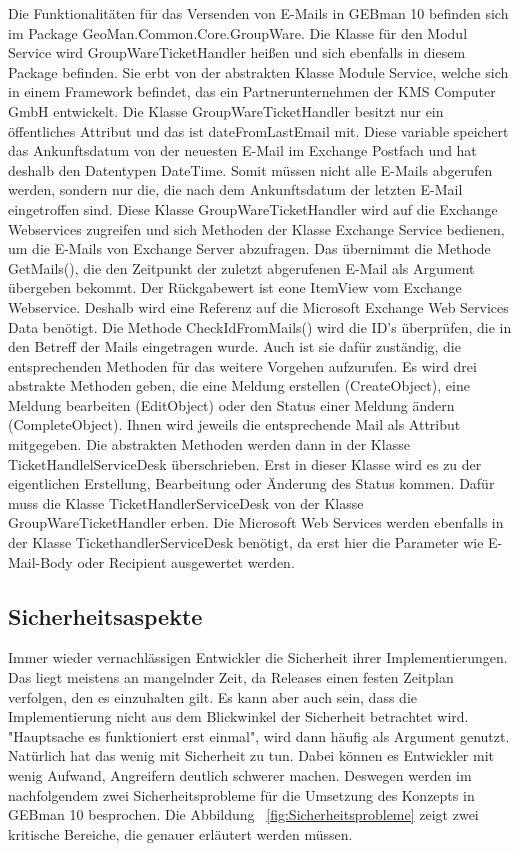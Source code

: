 \noindent
Die Funktionalitäten für das Versenden von E-Mails in GEBman 10 befinden sich im Package GeoMan.Common.Core.GroupWare. Die Klasse für den Modul Service wird GroupWareTicketHandler heißen und sich ebenfalls in diesem Package befinden. Sie erbt von der abstrakten Klasse Module Service, welche sich in einem Framework befindet, das ein Partnerunternehmen der KMS Computer GmbH entwickelt. Die Klasse GroupWareTicketHandler besitzt nur ein öffentliches Attribut und das ist dateFromLastEmail mit. Diese variable speichert das Ankunftsdatum von der neuesten E-Mail im Exchange Postfach und hat deshalb den Datentypen DateTime. Somit müssen nicht alle E-Mails abgerufen werden, sondern nur die, die nach dem Ankunftsdatum der letzten E-Mail eingetroffen sind.\newline
Diese Klasse GroupWareTicketHandler wird auf die Exchange Webservices zugreifen und sich Methoden der Klasse Exchange Service bedienen, um die E-Mails von Exchange Server abzufragen. Das übernimmt die Methode GetMails(), die den Zeitpunkt der zuletzt abgerufenen E-Mail als Argument übergeben bekommt. Der Rückgabewert ist eone ItemView vom Exchange Webservice. Deshalb wird eine Referenz auf die Microsoft Exchange Web Services Data benötigt.
\newline 
Die Methode CheckIdFromMails() wird die ID's überprüfen, die in den Betreff der Mails eingetragen wurde. Auch ist sie dafür zuständig, die entsprechenden Methoden für das weitere Vorgehen aufzurufen. Es wird drei abstrakte Methoden geben, die eine Meldung erstellen (CreateObject), eine Meldung bearbeiten (EditObject) oder den Status einer Meldung ändern (CompleteObject). Ihnen wird jeweils die entsprechende Mail als Attribut mitgegeben. Die abstrakten Methoden werden dann in der Klasse TicketHandlelServiceDesk überschrieben. Erst in dieser Klasse wird es zu der eigentlichen Erstellung, Bearbeitung oder Änderung des Status kommen. Dafür muss die Klasse TicketHandlerServiceDesk von der Klasse GroupWareTicketHandler erben. Die Microsoft Web Services werden ebenfalls in der Klasse TickethandlerServiceDesk benötigt, da erst hier die Parameter wie E-Mail-Body oder Recipient ausgewertet werden.


\subsection{Sicherheitsaspekte}
\noindent
Immer wieder vernachlässigen Entwickler die Sicherheit ihrer Implementierungen. Das liegt meistens an mangelnder Zeit, da Releases einen festen Zeitplan verfolgen, den es einzuhalten gilt. Es kann aber auch sein, dass die Implementierung nicht aus dem Blickwinkel der Sicherheit betrachtet wird. "Hauptsache es funktioniert erst einmal", wird dann häufig als Argument genutzt. Natürlich hat das wenig mit Sicherheit zu tun. Dabei können es Entwickler mit wenig Aufwand, Angreifern deutlich schwerer machen. Deswegen werden im nachfolgendem zwei Sicherheitsprobleme für die Umsetzung des Konzepts in GEBman 10 besprochen. Die Abbildung ~\ref{fig:Sicherheitsprobleme} zeigt zwei kritische Bereiche, die genauer erläutert werden müssen.

